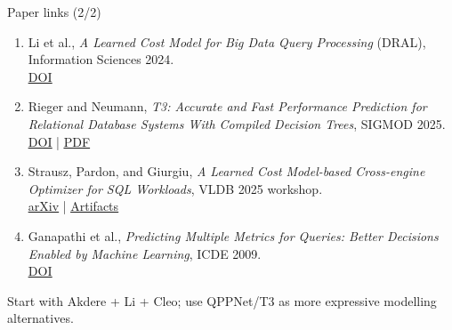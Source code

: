 \documentclass[aspectratio=169,10pt]{beamer}
\newcommand{\paperlink}[2]{\href{#1}{\textcolor{WayangTeal}{\underline{#2}}}}
\begin{document}
\begin{frame}[shrink=10]{Paper links (2/2)}
\small
\begin{enumerate}\setlength\itemsep{5pt}
\item Li et al., \emph{A Learned Cost Model for Big Data Query Processing} (DRAL), Information Sciences 2024.\\
\paperlink{https://doi.org/10.1016/j.ins.2024.120650}{DOI}
\item Rieger and Neumann, \emph{T3: Accurate and Fast Performance Prediction for Relational Database Systems With Compiled Decision Trees}, SIGMOD 2025.\\
\paperlink{https://doi.org/10.1145/3725364}{DOI} \;|\; \paperlink{https://db.in.tum.de/~rieger/papers/t3.pdf}{PDF}
\item Strausz, Pardon, and Giurgiu, \emph{A Learned Cost Model-based Cross-engine Optimizer for SQL Workloads}, VLDB 2025 workshop.\\
\paperlink{https://arxiv.org/abs/2506.02802}{arXiv} \;|\; \paperlink{https://github.com/strausza-ibm/cross-engine-optim-artifacts}{Artifacts}
\item Ganapathi et al., \emph{Predicting Multiple Metrics for Queries: Better Decisions Enabled by Machine Learning}, ICDE 2009.\\
\paperlink{https://doi.org/10.1109/ICDE.2009.130}{DOI}
\end{enumerate}
\vspace{4mm}
\centering\textcolor{WayangNavy}{\Large Start with Akdere + Li + Cleo; use QPPNet/T3 as more expressive modelling alternatives.}
\end{frame}
\end{document}
